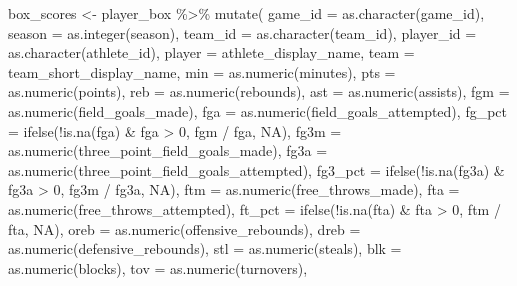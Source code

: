 \documentclass[
  letterpaper,
  DIV=11,
  numbers=noendperiod]{scrartcl}
\newenvironment{Shaded}{\begin{snugshade}}{\end{snugshade}}
\newcommand{\AttributeTok}[1]{\textcolor[rgb]{0.40,0.45,0.13}{#1}}
\newcommand{\ConstantTok}[1]{\textcolor[rgb]{0.56,0.35,0.01}{#1}}
\newcommand{\DecValTok}[1]{\textcolor[rgb]{0.68,0.00,0.00}{#1}}
\newcommand{\FunctionTok}[1]{\textcolor[rgb]{0.28,0.35,0.67}{#1}}
\newcommand{\NormalTok}[1]{\textcolor[rgb]{0.00,0.23,0.31}{#1}}
\newcommand{\OtherTok}[1]{\textcolor[rgb]{0.00,0.23,0.31}{#1}}
\newcommand{\SpecialCharTok}[1]{\textcolor[rgb]{0.37,0.37,0.37}{#1}}
\begin{document}
\begin{Shaded}
\begin{Highlighting}[]
\NormalTok{box\_scores }\OtherTok{\textless{}{-}}\NormalTok{ player\_box }\SpecialCharTok{\%\textgreater{}\%}
  \FunctionTok{mutate}\NormalTok{(}
    \AttributeTok{game\_id =} \FunctionTok{as.character}\NormalTok{(game\_id),}
    \AttributeTok{season =} \FunctionTok{as.integer}\NormalTok{(season),}
    \AttributeTok{team\_id =} \FunctionTok{as.character}\NormalTok{(team\_id),}
    \AttributeTok{player\_id =} \FunctionTok{as.character}\NormalTok{(athlete\_id),}
    \AttributeTok{player =}\NormalTok{ athlete\_display\_name,}
    \AttributeTok{team =}\NormalTok{ team\_short\_display\_name,}
    \AttributeTok{min =} \FunctionTok{as.numeric}\NormalTok{(minutes),}
    \AttributeTok{pts =} \FunctionTok{as.numeric}\NormalTok{(points),}
    \AttributeTok{reb =} \FunctionTok{as.numeric}\NormalTok{(rebounds),}
    \AttributeTok{ast =} \FunctionTok{as.numeric}\NormalTok{(assists),}
    \AttributeTok{fgm =} \FunctionTok{as.numeric}\NormalTok{(field\_goals\_made),}
    \AttributeTok{fga =} \FunctionTok{as.numeric}\NormalTok{(field\_goals\_attempted),}
    \AttributeTok{fg\_pct =} \FunctionTok{ifelse}\NormalTok{(}\SpecialCharTok{!}\FunctionTok{is.na}\NormalTok{(fga) }\SpecialCharTok{\&}\NormalTok{ fga }\SpecialCharTok{\textgreater{}} \DecValTok{0}\NormalTok{, fgm }\SpecialCharTok{/}\NormalTok{ fga, }\ConstantTok{NA}\NormalTok{),}
    \AttributeTok{fg3m =} \FunctionTok{as.numeric}\NormalTok{(three\_point\_field\_goals\_made),}
    \AttributeTok{fg3a =} \FunctionTok{as.numeric}\NormalTok{(three\_point\_field\_goals\_attempted),}
    \AttributeTok{fg3\_pct =} \FunctionTok{ifelse}\NormalTok{(}\SpecialCharTok{!}\FunctionTok{is.na}\NormalTok{(fg3a) }\SpecialCharTok{\&}\NormalTok{ fg3a }\SpecialCharTok{\textgreater{}} \DecValTok{0}\NormalTok{, fg3m }\SpecialCharTok{/}\NormalTok{ fg3a, }\ConstantTok{NA}\NormalTok{),}
    \AttributeTok{ftm =} \FunctionTok{as.numeric}\NormalTok{(free\_throws\_made),}
    \AttributeTok{fta =} \FunctionTok{as.numeric}\NormalTok{(free\_throws\_attempted),}
    \AttributeTok{ft\_pct =} \FunctionTok{ifelse}\NormalTok{(}\SpecialCharTok{!}\FunctionTok{is.na}\NormalTok{(fta) }\SpecialCharTok{\&}\NormalTok{ fta }\SpecialCharTok{\textgreater{}} \DecValTok{0}\NormalTok{, ftm }\SpecialCharTok{/}\NormalTok{ fta, }\ConstantTok{NA}\NormalTok{),}
    \AttributeTok{oreb =} \FunctionTok{as.numeric}\NormalTok{(offensive\_rebounds),}
    \AttributeTok{dreb =} \FunctionTok{as.numeric}\NormalTok{(defensive\_rebounds),}
    \AttributeTok{stl =} \FunctionTok{as.numeric}\NormalTok{(steals),}
    \AttributeTok{blk =} \FunctionTok{as.numeric}\NormalTok{(blocks),}
    \AttributeTok{tov =} \FunctionTok{as.numeric}\NormalTok{(turnovers),}

\end{Highlighting}
\end{Shaded}
\end{document}

